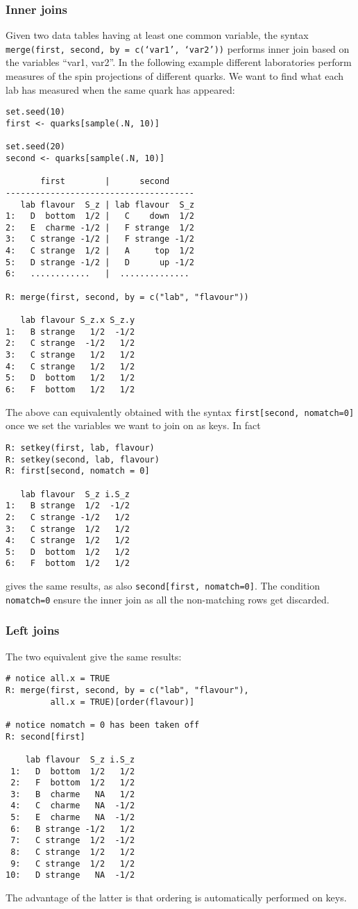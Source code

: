 \subsubsection*{Inner joins}
Given two data tables having at least one common
variable, the syntax
\texttt{merge(first, second, by = c(`var1', `var2'))}
performs inner join based on the variables ``var1, var2''.
In the following example different laboratories
perform measures of the spin projections of 
different quarks. We want to find what each lab
has measured when the same quark has appeared:
\begin{verbatim}
set.seed(10)
first <- quarks[sample(.N, 10)]

set.seed(20)
second <- quarks[sample(.N, 10)]

       first        |      second
--------------------------------------
   lab flavour  S_z | lab flavour  S_z
1:   D  bottom  1/2 |   C    down  1/2
2:   E  charme -1/2 |   F strange  1/2
3:   C strange -1/2 |   F strange -1/2
4:   C strange  1/2 |   A     top  1/2
5:   D strange -1/2 |   D      up -1/2
6:   ............   |  ..............

R: merge(first, second, by = c("lab", "flavour"))

   lab flavour S_z.x S_z.y
1:   B strange   1/2  -1/2
2:   C strange  -1/2   1/2
3:   C strange   1/2   1/2
4:   C strange   1/2   1/2
5:   D  bottom   1/2   1/2
6:   F  bottom   1/2   1/2
\end{verbatim}
The above can equivalently obtained with the  
syntax \texttt{first[second, nomatch=0]} once we set the 
variables we want to join on as keys. In fact
\begin{verbatim}
R: setkey(first, lab, flavour)
R: setkey(second, lab, flavour)
R: first[second, nomatch = 0]

   lab flavour  S_z i.S_z
1:   B strange  1/2  -1/2
2:   C strange -1/2   1/2
3:   C strange  1/2   1/2
4:   C strange  1/2   1/2
5:   D  bottom  1/2   1/2
6:   F  bottom  1/2   1/2
\end{verbatim}
gives the same results, as also \texttt{second[first, nomatch=0]}.
The condition \texttt{nomatch=0} ensure the inner join as 
all the non-matching rows get discarded.

\subsubsection*{Left joins}
The two equivalent give the same results:
\begin{verbatim}
# notice all.x = TRUE
R: merge(first, second, by = c("lab", "flavour"), 
         all.x = TRUE)[order(flavour)]
                        
# notice nomatch = 0 has been taken off
R: second[first]   

    lab flavour  S_z i.S_z
 1:   D  bottom  1/2   1/2
 2:   F  bottom  1/2   1/2
 3:   B  charme   NA   1/2
 4:   C  charme   NA  -1/2
 5:   E  charme   NA  -1/2
 6:   B strange -1/2   1/2
 7:   C strange  1/2  -1/2
 8:   C strange  1/2   1/2
 9:   C strange  1/2   1/2
10:   D strange   NA  -1/2
\end{verbatim}
The advantage of the latter is that ordering is 
automatically performed on keys.

